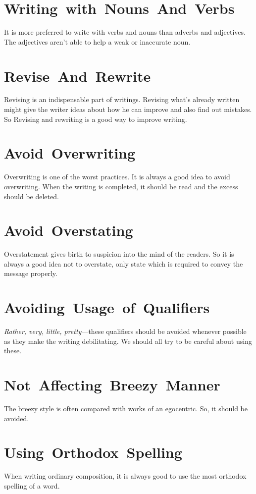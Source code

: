 \documentclass[12pt]{report}
\begin{document}
\section{\mbox{Writing with Nouns And Verbs}}
It is more preferred to write with verbs and nouns than adverbs and adjectives. The adjectives aren't able to help a weak or inaccurate noun.


\section{\mbox{Revise And Rewrite}}
Revising is an indispensable part of writings. Revising what's already written might give the writer ideas about how he can improve and also find out mistakes. So Revising and rewriting is a good way to improve writing.


\section{\mbox{Avoid Overwriting}}
Overwriting is one of the worst practices. It is always a good idea to avoid overwriting. When the writing is completed, it should be read and the excess should be deleted.


\section{\mbox{Avoid Overstating}}
Overstatement gives birth to suspicion into the mind of the readers. So it is always a good idea not to overstate, only state which is required to convey the message properly.


\section{\mbox{Avoiding Usage of Qualifiers}}
\textit{Rather, very, little, pretty}---these qualifiers should be avoided whenever possible as they make the writing debilitating. We should all try to be careful about using these.


\section{\mbox{Not Affecting Breezy Manner}}
The breezy style is often compared with works of an egocentric. So, it should be avoided.


\section{\mbox{Using Orthodox Spelling}}
When writing ordinary composition, it is always good to use the most orthodox spelling of a word.
\end{document}
